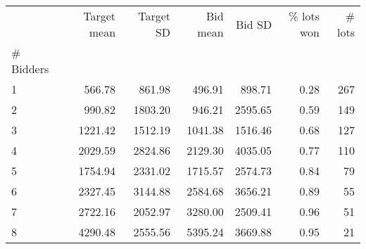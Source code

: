 \begin{tabular}{lrrrrrr}
\toprule
{} &  Target mean &  Target SD &  Bid mean &  Bid SD &  \% lots won &  \# lots \\
\# Bidders &              &            &           &         &             &         \\
\midrule
1         &       566.78 &     861.98 &    496.91 &  898.71 &        0.28 &     267 \\
2         &       990.82 &    1803.20 &    946.21 & 2595.65 &        0.59 &     149 \\
3         &      1221.42 &    1512.19 &   1041.38 & 1516.46 &        0.68 &     127 \\
4         &      2029.59 &    2824.86 &   2129.30 & 4035.05 &        0.77 &     110 \\
5         &      1754.94 &    2331.02 &   1715.57 & 2574.73 &        0.84 &      79 \\
6         &      2327.45 &    3144.88 &   2584.68 & 3656.21 &        0.89 &      55 \\
7         &      2722.16 &    2052.97 &   3280.00 & 2509.41 &        0.96 &      51 \\
8         &      4290.48 &    2555.56 &   5395.24 & 3669.88 &        0.95 &      21 \\
\bottomrule
\end{tabular}
